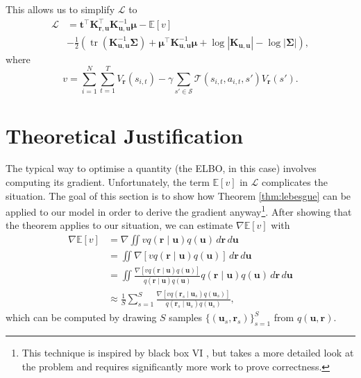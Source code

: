 \documentclass{mpaper}
\DeclareMathOperator{\tr}{tr}
\newcommand{\V}{V_{\mathbf{r}}}
\newcommand{\dx}{\,d\mathbf{r}\,d\mathbf{u}}
\newcommand{\Kuu}{\mathbf{K}_{\mathbf{u},\mathbf{u}}}
\newcommand{\Kru}{\mathbf{K}_{\mathbf{r},\mathbf{u}}}
\newcommand{\approximation}{q(\mathbf{u}, \mathbf{r})}
\begin{document}
This allows us to simplify $\mathcal{L}$ to
\begin{align*}
  \mathcal{L} &= \mathbf{t}^\intercal\Kru^\intercal\Kuu^{-1}\bm\mu - \mathbb{E}[v] \\
              &- \frac{1}{2} \left(\tr \left( \Kuu^{-1}\bm\Sigma \right) + \bm\mu^\intercal\Kuu^{-1}\bm\mu + \log |\Kuu| - \log |\bm\Sigma| \right),
\end{align*}
where
\[
  v = \sum_{i=1}^N \sum_{t=1}^T \V(s_{i,t}) - \gamma\sum_{s' \in \mathcal{S}}
  \mathcal{T}(s_{i,t}, a_{i,t}, s')\V(s').
\]

\section{Theoretical Justification} \label{sec:proof}

The typical way to optimise a quantity (the ELBO, in this case) involves
computing its gradient. Unfortunately, the term $\mathbb{E}[v]$ in $\mathcal{L}$
complicates the situation. The goal of this section is to show how Theorem
\ref{thm:lebesgue} can be applied to our model in order to derive the gradient
anyway\footnote{This technique is inspired by black box VI
  \cite{DBLP:conf/aistats/RanganathGB14}, but takes a more detailed look at the
  problem and requires significantly more work to prove correctness.}. After
showing that the theorem applies to our situation, we can estimate
$\nabla\mathbb{E}[v]$ with
\begin{align*}
  \nabla\mathbb{E}[v] &= \nabla \iint v q(\mathbf{r} \mid \mathbf{u}) q(\mathbf{u})\dx \\
                      &= \iint \nabla[v q(\mathbf{r} \mid \mathbf{u}) q(\mathbf{u})]\dx \\
                      &= \iint \frac{\nabla[v q(\mathbf{r} \mid \mathbf{u})q(\mathbf{u})]}{q(\mathbf{r} \mid \mathbf{u})q(\mathbf{u})} q(\mathbf{r} \mid \mathbf{u}) q(\mathbf{u})\dx \\
                      &\approx \frac{1}{S} \sum_{s=1}^S \frac{\nabla[v q(\mathbf{r}_s \mid \mathbf{u}_s)q(\mathbf{u}_s)]}{q(\mathbf{r}_s \mid \mathbf{u}_s)q(\mathbf{u}_s)},
\end{align*}
which can be computed by drawing $S$ samples $\{(\mathbf{u}_s,
\mathbf{r}_s)\}_{s=1}^S$ from $\approximation$.
\end{document}

